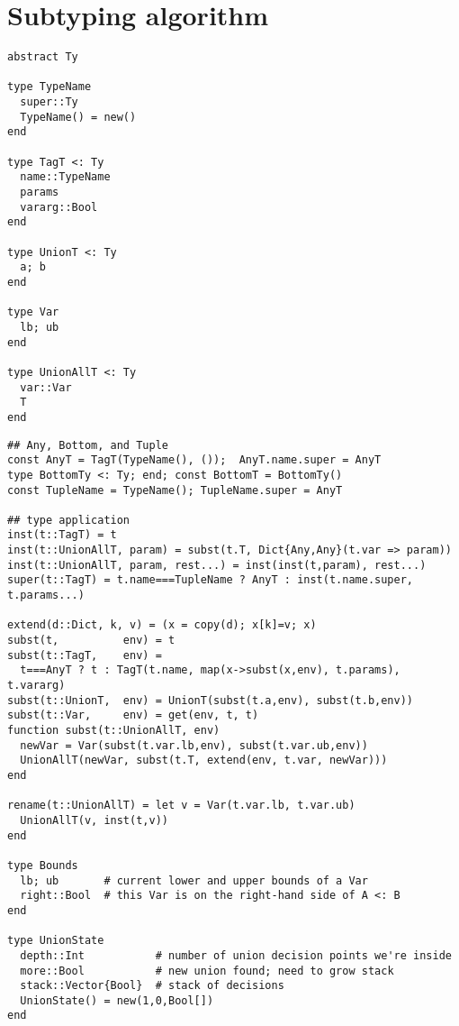 \chapter{Subtyping algorithm}

\begin{singlespace}
\begin{multicols}{2}
\begin{lstlisting}[style=customjulia]
abstract Ty

type TypeName
  super::Ty
  TypeName() = new()
end

type TagT <: Ty
  name::TypeName
  params
  vararg::Bool
end

type UnionT <: Ty
  a; b
end

type Var
  lb; ub
end

type UnionAllT <: Ty
  var::Var
  T
end
\end{lstlisting}
\end{multicols}

\vspace{-3ex}
\begin{lstlisting}[style=customjulia]
## Any, Bottom, and Tuple
const AnyT = TagT(TypeName(), ());  AnyT.name.super = AnyT
type BottomTy <: Ty; end; const BottomT = BottomTy()
const TupleName = TypeName(); TupleName.super = AnyT

## type application
inst(t::TagT) = t
inst(t::UnionAllT, param) = subst(t.T, Dict{Any,Any}(t.var => param))
inst(t::UnionAllT, param, rest...) = inst(inst(t,param), rest...)
super(t::TagT) = t.name===TupleName ? AnyT : inst(t.name.super, t.params...)

extend(d::Dict, k, v) = (x = copy(d); x[k]=v; x)
subst(t,          env) = t
subst(t::TagT,    env) =
  t===AnyT ? t : TagT(t.name, map(x->subst(x,env), t.params), t.vararg)
subst(t::UnionT,  env) = UnionT(subst(t.a,env), subst(t.b,env))
subst(t::Var,     env) = get(env, t, t)
function subst(t::UnionAllT, env)
  newVar = Var(subst(t.var.lb,env), subst(t.var.ub,env))
  UnionAllT(newVar, subst(t.T, extend(env, t.var, newVar)))
end

rename(t::UnionAllT) = let v = Var(t.var.lb, t.var.ub)
  UnionAllT(v, inst(t,v))
end

type Bounds
  lb; ub       # current lower and upper bounds of a Var
  right::Bool  # this Var is on the right-hand side of A <: B
end

type UnionState
  depth::Int           # number of union decision points we're inside
  more::Bool           # new union found; need to grow stack
  stack::Vector{Bool}  # stack of decisions
  UnionState() = new(1,0,Bool[])
end


\end{lstlisting}
\end{singlespace}
